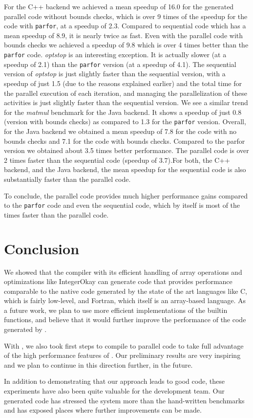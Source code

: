 For the \xten C++ backend we achieved a mean speedup of 16.0 for the
generated parallel \xten code without bounds checks, which is over 9
times of the speedup for the \matlab code with \texttt{parfor}, at a
speedup of 2.3. Compared to \xten sequential code which has a mean
speedup of 8.9, it is nearly twice as fast.  Even with the parallel
\xten code with bounds checks we achieved a speedup of 9.8 which is over 4
times better than the \matlab \texttt{parfor} code.  \emph{optstop} is
an interesting exception. It is actually slower (at a speedup of 2.1)
than the \matlab \texttt{parfor} version (at a speedup of 4.1). The
sequential version of \emph{optstop} is just slightly faster than the
sequential \matlab version, with a speedup of just 1.5 (due to the
reasons explained earlier) and the total time for the parallel execution
of each iteration, and managing the parallelization of these activities
is just slightly faster than the sequential version. We see a similar
trend for the \emph{matmul} benchmark for the \xten Java backend. It
shows a speedup of just 0.8 (version with bounds checks) as compared to
1.3 for the \matlab \texttt{parfor} version. Overall, for the Java
backend we obtained a mean speedup of 7.8 for the \xten code with no
bounds checks and 7.1 for the code with bounds checks. Compared to the
\matlab parfor version we obtained about 3.5 times better performance. The
parallel \xten code is over 2 times faster than the sequential \xten
code (speedup of 3.7).For both, the C++ backend, and the Java backend,
the mean speedup for the sequential \xten code is also substantially
faster than the \matlab parallel code.  

To conclude, the parallel \xten code provides much higher performance
gains compared to the \matlab \texttt{parfor} code  and even the \xten
sequential code, which by itself is most of the times faster than the
\matlab parallel code.


\section{Conclusion}

We showed that the \mixten compiler with its efficient handling of array
operations and optimizations like IntegerOkay can generate \xten code
that provides performance comparable to the native code generated by the
state of the art languages like C, which is fairly low-level, and
Fortran, which itself is an array-based language.  As a future work, we
plan to use more efficient implementations of the builtin functions, and
believe that it would further improve the performance of the code
generated by \mixten.

With \mixten, we also took first steps to compile \matlab to parallel
\xten code to take full advantage of the high performance features of
\xten. Our preliminary results are very inspiring and we plan to
continue in this direction further, in the future.

In addition to demonstrating that our approach leads to good code, these
experiments have also been quite valuable for the \xten development team.
Our generated code has stressed the \xten system more than the
hand-written \xten benchmarks and has exposed places where further
improvements can be made.
